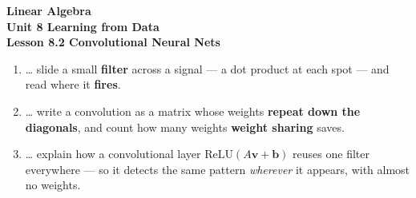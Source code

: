 \documentclass[10pt]{article}
\begin{document}
\vspace{-0.8in}

\begin{center}
  {\color{white}\textbf{\LARGE Linear Algebra}}\\[4pt]
  {\color{blushmid}\large\textbf{Unit 8 \quad Learning from Data}}\\[6pt]
  {\color{white}\textbf{\large Lesson 8.2 \quad Convolutional Neural Nets}}
\end{center}

\vspace{0.22in}
\namedateperiod
\vspace{0.18in}

\begin{learningtargetbox}
\small
\begin{enumerate}[leftmargin=1.5em, itemsep=5pt]
  \item \ldots{} slide a small \textbf{filter} across a signal --- a dot product at each spot --- and read where it \textbf{fires}.
  \item \ldots{} write a convolution as a matrix whose weights \textbf{repeat down the diagonals}, and count how many weights \textbf{weight sharing} saves.
  \item \ldots{} explain how a convolutional layer $\mathrm{ReLU}(A\mathbf{v}+\mathbf{b})$ reuses one filter everywhere --- so it detects the same pattern \emph{wherever} it appears, with almost no weights.
\end{enumerate}
\end{learningtargetbox}

\vspace{0.14in}
\end{document}
